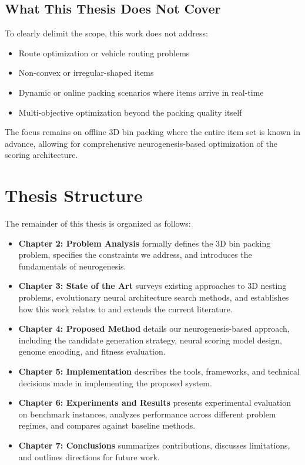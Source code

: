 \subsection{What This Thesis Does Not Cover}

To clearly delimit the scope, this work does not address:
\begin{itemize}
    \item Route optimization or vehicle routing problems
    \item Non-convex or irregular-shaped items
    \item Dynamic or online packing scenarios where items arrive in real-time
    \item Multi-objective optimization beyond the packing quality itself
\end{itemize}

The focus remains on offline 3D bin packing where the entire item set is known in advance, allowing for comprehensive neurogenesis-based optimization of the scoring architecture.

\section{Thesis Structure}

The remainder of this thesis is organized as follows:

\begin{itemize}
    \item \textbf{Chapter 2: Problem Analysis} formally defines the 3D bin packing problem, specifies the constraints we address, and introduces the fundamentals of neurogenesis.

    \item \textbf{Chapter 3: State of the Art} surveys existing approaches to 3D nesting problems, evolutionary neural architecture search methods, and establishes how this work relates to and extends the current literature.

    \item \textbf{Chapter 4: Proposed Method} details our neurogenesis-based approach, including the candidate generation strategy, neural scoring model design, genome encoding, and fitness evaluation.

    \item \textbf{Chapter 5: Implementation} describes the tools, frameworks, and technical decisions made in implementing the proposed system.

    \item \textbf{Chapter 6: Experiments and Results} presents experimental evaluation on benchmark instances, analyzes performance across different problem regimes, and compares against baseline methods.

    \item \textbf{Chapter 7: Conclusions} summarizes contributions, discusses limitations, and outlines directions for future work.
\end{itemize}
